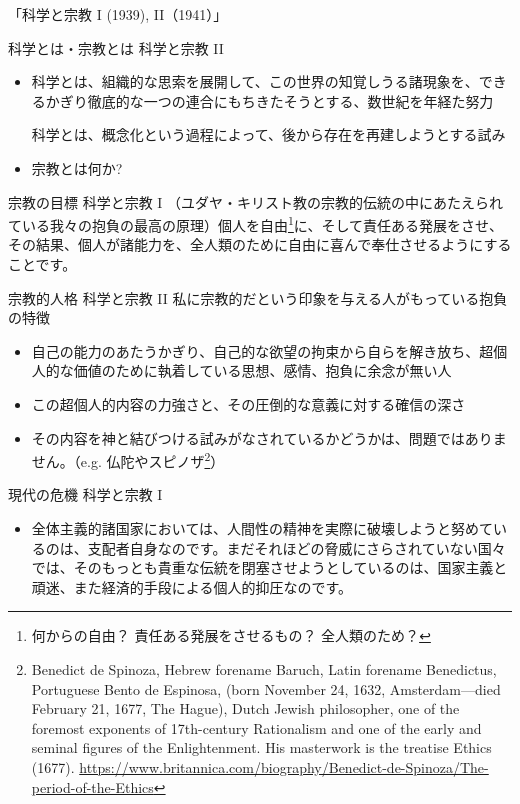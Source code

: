 \documentclass[10pt, dvipdfmx]{beamer}
\begin{document}
\begin{frame}{「科学と宗教 I (1939), II（1941）」}

\begin{block}{科学とは・宗教とは \hfill 科学と宗教 II}
\begin{itemize}
\item 科学とは、組織的な思索を展開して、この世界の知覚しうる諸現象を、できるかぎり徹底的な一つの連合にもちきたそうとする、数世紀を年経た努力\par
科学とは、概念化という過程によって、後から存在を再建しようとする試み
\item 宗教とは何か?
\end{itemize}
\end{block}

\bigskip
\begin{block}{宗教の目標 \hfill 科学と宗教 I}
（ユダヤ・キリスト教の宗教的伝統の中にあたえられている我々の抱負の最高の原理）個人を自由\footnote{何からの自由？ 責任ある発展をさせるもの？ 全人類のため？}に、そして責任ある発展をさせ、その結果、個人が諸能力を、全人類のために自由に喜んで奉仕させるようにすることです。
\end{block}
\end{frame}

\begin{frame}{}
\begin{block}{宗教的人格 \hfill 科学と宗教 II}
私に宗教的だという印象を与える人がもっている抱負の特徴
\begin{itemize}
\item 自己の能力のあたうかぎり、自己的な欲望の拘束から自らを解き放ち、超個人的な価値のために執着している思想、感情、抱負に余念が無い人
\item この超個人的内容の力強さと、その圧倒的な意義に対する確信の深さ
\item その内容を神と結びつける試みがなされているかどうかは、問題ではありません。（e.g. 仏陀やスピノザ\footnote{Benedict de Spinoza, Hebrew forename Baruch, Latin forename Benedictus, Portuguese Bento de Espinosa, (born November 24, 1632, Amsterdam—died February 21, 1677, The Hague), Dutch Jewish philosopher, one of the foremost exponents of 17th-century Rationalism and one of the early and seminal figures of the Enlightenment. His masterwork is the treatise Ethics (1677). 
\url{https://www.britannica.com/biography/Benedict-de-Spinoza/The-period-of-the-Ethics}}）
\end{itemize}
\end{block}

\begin{block}{現代の危機 \hfill 科学と宗教 I}
\begin{itemize}
\item 全体主義的諸国家においては、人間性の精神を実際に破壊しようと努めているのは、支配者自身なのです。まだそれほどの脅威にさらされていない国々では、そのもっとも貴重な伝統を閉塞させようとしているのは、国家主義と頑迷、また経済的手段による個人的抑圧なのです。
\end{itemize}
\end{block}
\end{frame}
\end{document}
